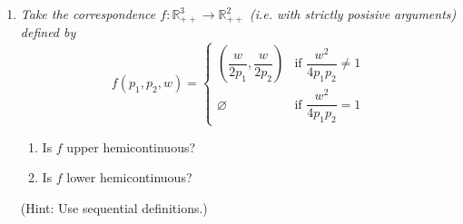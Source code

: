 \documentclass{article}
\begin{document}
\begin{enumerate}[1.]
  \item {\itshape
    Take the correspondence $f: \mathbb{R}^3_{++} \to \mathbb{R}^2_{++}$ (i.e. with strictly posisive arguments) defined by
    \[
      f(p_1, p_2, w)
      =
      \begin{cases}
        \left(\dfrac{w}{2p_1}, \dfrac{w}{2 p_2}\right)
          & \text{if } \dfrac{w^2}{4 p_1 p_2} \ne 1 \\[6pt]
        \varnothing
          & \text{if } \dfrac{w^2}{4 p_1 p_2} = 1
      \end{cases}
    \]

    \begin{enumerate}
      \item Is $f$ upper hemicontinuous?

      \item Is $f$ lower hemicontinuous?
    \end{enumerate}

    (Hint: Use sequential definitions.)
  }
\end{enumerate}

\end{document}

